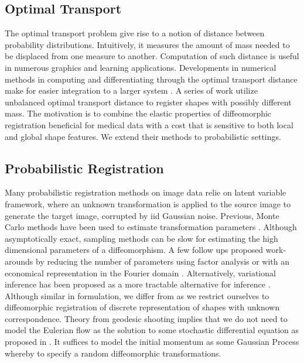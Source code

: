 \documentclass{6838publ}
\begin{document}
\subsection{Optimal Transport}

The optimal transport problem give rise to a notion of distance between probability distributions. Intuitively, it measures the amount of mass needed to be displaced from one measure to another. Computation of such distance is useful in numerous graphics \cite{degoesOptimalTransportApproach2011,degoesBlueNoiseOptimal2012,solomonConvolutionalWassersteinDistances2015} and learning \cite{frognerLearningWassersteinLoss2015, janatiSpatioTemporalAlignmentsOptimal2020} applications. Developments in numerical methods in computing and differentiating through the optimal transport distance make for easier integration to a larger system \cite{cuturiSinkhornDistancesLightspeed2013,altschulerNearlinearTimeApproximation2018,genevayLearningGenerativeModels2018,schmitzerStabilizedSparseScaling2019}. A series of work \cite{feydyOptimalTransportDiffeomorphic2017a,feydyFastScalableOptimal2019} utilize unbalanced optimal transport distance to register shapes with possibly different mass. The motivation is to combine the elastic properties of diffeomorphic registration beneficial for medical data with a cost that is sensitive to both local and global shape features. We extend their methods to probabilistic settings.


\subsection{Probabilistic Registration}

Many probabilistic registration methods on image data relie on latent variable framework, where an unknown transformation is applied to the source image to generate the target image, corrupted by iid Gaussian noise. Previous, Monte Carlo methods have been used to estimate transformation parameters \cite{risholmBayesianCharacterizationUncertainty2013,zhangBayesianEstimationRegularization2013}. Although asymptotically exact, sampling methods can be slow for estimating the high dimensional parameters of a diffeomorphism. A few follow ups proposed work-arounds by reducing the number of parameters using factor analysis \cite{risholmBayesianCharacterizationUncertainty2013} or with an economical representation in the Fourier domain \cite{wangRegistrationUncertaintyQuantification2019}. Alternatively, variational inference has been proposed as a more tractable alternative for inference \cite{wassermannProbabilisticDiffeomorphicRegistration2014,dalcaUnsupervisedLearningProbabilistic2019}. Although similar in formulation, we differ from \cite{wassermannProbabilisticDiffeomorphicRegistration2014} as we restrict ourselves to diffeomorphic registration of discrete representation of shapes with unknown correspondence. Theory from geodesic shooting implies that we do not need to model the Eulerian flow as the solution to some stochastic differential equation as proposed in \cite{wassermannProbabilisticDiffeomorphicRegistration2014}. It suffices to model the initial momentum as some Gaussian Process whereby to specify a random diffeomorphic transformations.
\end{document}
